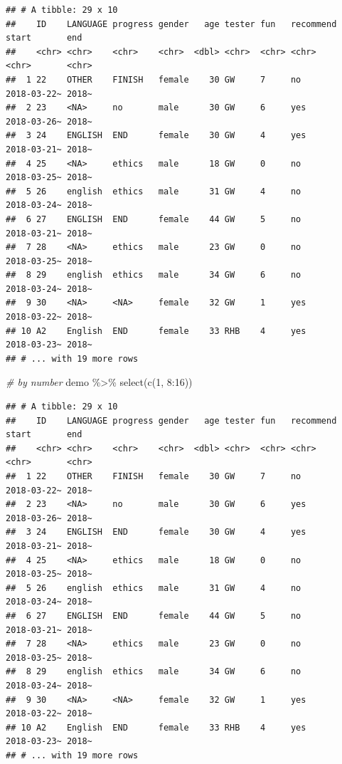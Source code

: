 \documentclass[
]{book}
\newenvironment{Shaded}{\begin{snugshade}}{\end{snugshade}}
\newcommand{\CommentTok}[1]{\textcolor[rgb]{0.56,0.35,0.01}{\textit{#1}}}
\newcommand{\DecValTok}[1]{\textcolor[rgb]{0.00,0.00,0.81}{#1}}
\newcommand{\FunctionTok}[1]{\textcolor[rgb]{0.00,0.00,0.00}{#1}}
\newcommand{\NormalTok}[1]{#1}
\newcommand{\SpecialCharTok}[1]{\textcolor[rgb]{0.00,0.00,0.00}{#1}}
\begin{document}
\begin{verbatim}
## # A tibble: 29 x 10
##    ID    LANGUAGE progress gender   age tester fun   recommend start       end  
##    <chr> <chr>    <chr>    <chr>  <dbl> <chr>  <chr> <chr>     <chr>       <chr>
##  1 22    OTHER    FINISH   female    30 GW     7     no        2018-03-22~ 2018~
##  2 23    <NA>     no       male      30 GW     6     yes       2018-03-26~ 2018~
##  3 24    ENGLISH  END      female    30 GW     4     yes       2018-03-21~ 2018~
##  4 25    <NA>     ethics   male      18 GW     0     no        2018-03-25~ 2018~
##  5 26    english  ethics   male      31 GW     4     no        2018-03-24~ 2018~
##  6 27    ENGLISH  END      female    44 GW     5     no        2018-03-21~ 2018~
##  7 28    <NA>     ethics   male      23 GW     0     no        2018-03-25~ 2018~
##  8 29    english  ethics   male      34 GW     6     no        2018-03-24~ 2018~
##  9 30    <NA>     <NA>     female    32 GW     1     yes       2018-03-22~ 2018~
## 10 A2    English  END      female    33 RHB    4     yes       2018-03-23~ 2018~
## # ... with 19 more rows
\end{verbatim}

\begin{Shaded}
\begin{Highlighting}[]
\CommentTok{\# by number}
\NormalTok{demo }\SpecialCharTok{\%\textgreater{}\%} \FunctionTok{select}\NormalTok{(}\FunctionTok{c}\NormalTok{(}\DecValTok{1}\NormalTok{, }\DecValTok{8}\SpecialCharTok{:}\DecValTok{16}\NormalTok{))}
\end{Highlighting}
\end{Shaded}

\begin{verbatim}
## # A tibble: 29 x 10
##    ID    LANGUAGE progress gender   age tester fun   recommend start       end  
##    <chr> <chr>    <chr>    <chr>  <dbl> <chr>  <chr> <chr>     <chr>       <chr>
##  1 22    OTHER    FINISH   female    30 GW     7     no        2018-03-22~ 2018~
##  2 23    <NA>     no       male      30 GW     6     yes       2018-03-26~ 2018~
##  3 24    ENGLISH  END      female    30 GW     4     yes       2018-03-21~ 2018~
##  4 25    <NA>     ethics   male      18 GW     0     no        2018-03-25~ 2018~
##  5 26    english  ethics   male      31 GW     4     no        2018-03-24~ 2018~
##  6 27    ENGLISH  END      female    44 GW     5     no        2018-03-21~ 2018~
##  7 28    <NA>     ethics   male      23 GW     0     no        2018-03-25~ 2018~
##  8 29    english  ethics   male      34 GW     6     no        2018-03-24~ 2018~
##  9 30    <NA>     <NA>     female    32 GW     1     yes       2018-03-22~ 2018~
## 10 A2    English  END      female    33 RHB    4     yes       2018-03-23~ 2018~
## # ... with 19 more rows
\end{verbatim}
\end{document}
